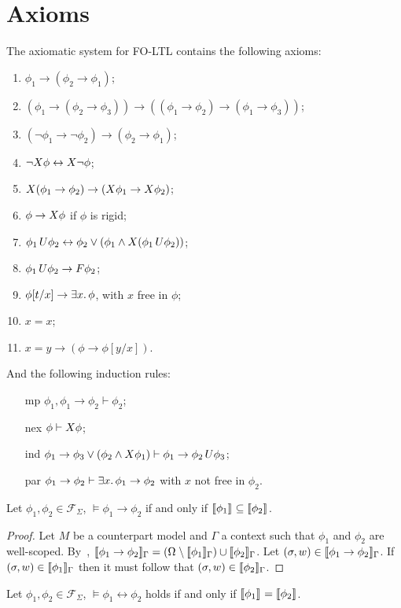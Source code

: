 \section{Axioms}
\begin{definition}
  The axiomatic system for FO-LTL contains the following axioms:
  \begin{enumerate}
    \item $\phi_1 \to (\phi_2 \to \phi_1)$;
    \item $(\phi_1 \to (\phi_2 \to \phi_3)) \to ((\phi_1 \to \phi_2) \to (\phi_1 \to \phi_3))$;
    \item $(\neg\phi_1 \to \neg\phi_2) \to (\phi_2 \to \phi_1)$;
    \item $\neg X{\phi} \leftrightarrow X{\neg\phi}$;
    \item $X{(\phi_1 \to \phi_2)} \to (X{\phi_1} \to X{\phi_2})$;
    \item $\phi \to X{\phi}$ if $\phi$ is rigid;
    \item ${\phi_1}\,U {\phi_2} \leftrightarrow \phi_2 \lor (\phi_1 \land X{({\phi_1}\,U {\phi_2})})$;
    \item ${\phi_1}\,U {\phi_2} \to F{\phi_2}$;
    \item $\phi[t/x] \to \exists {x} \ldotp {\phi}$, with $x$ free in $\phi$;
    \item $x = x$;
    \item $x = y \to (\phi \to \phi[y/x])$.
  \end{enumerate}
  And the following induction rules:
  \begin{enumerate}
    \item[mp] $\phi_1, \phi_1 \to \phi_2 \vdash \phi_2$;
    \item[nex] $\phi \vdash X{\phi}$;
    \item[ind] $\phi_1 \to \phi_3 \lor (\phi_2 \land X{\phi_1}) \vdash \phi_1 \to {\phi_2}\,U {\phi_3}$;
    \item[par] $\phi_1 \to \phi_2 \vdash \exists {x} \ldotp {\phi_1} \to \phi_2$ with $x$ not free in $\phi_2$.
  \end{enumerate}
\end{definition}

\begin{theorem}\label{thm:implsem}
  Let $\phi_1, \phi_2 \in \mathcal{F}_\Sigma$, $\vDash \phi_1 \to \phi_2$ if and only if $\llbracket \phi_1 \rrbracket_{} \subseteq
  \llbracket \phi_2 \rrbracket_{}$.
\end{theorem}
\begin{proof}
  Let $M$ be a counterpart model and $\Gamma$ a context such that $\phi_1$ and $\phi_2$ are
  well-scoped. By~, $\llbracket \phi_1 \to \phi_2 \rrbracket_{\Gamma} = (\Omega_{} \setminus \llbracket \phi_1 \rrbracket_{\Gamma})
  \cup \llbracket \phi_2 \rrbracket_{\Gamma}$. Let $(\sigma, w) \in \llbracket \phi_1 \to \phi_2 \rrbracket_{\Gamma}$. If $(\sigma, w) \in
  \llbracket \phi_1 \rrbracket_{\Gamma}$ then it must follow that $(\sigma, w) \in \llbracket \phi_2 \rrbracket_{\Gamma}$.
\end{proof}
\begin{corollary}\label{cor:iffsem}
  Let $\phi_1, \phi_2 \in \mathcal{F}_\Sigma$, $\vDash \phi_1 \leftrightarrow \phi_2$ holds if and only if
  $\llbracket \phi_1 \rrbracket_{} =
  \llbracket \phi_2 \rrbracket_{}$.
\end{corollary}


